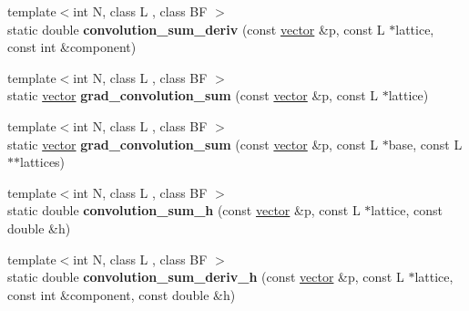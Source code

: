 \begin{DoxyCompactItemize}
\item 
\mbox{\label{classsisl_1_1bcc__quintic__rdo_a5f6c752139fa6c57bc4eaff97880e3ad}} 
{\footnotesize template$<$int N, class L , class BF $>$ }\\static double {\bfseries convolution\+\_\+sum\+\_\+deriv} (const \hyperlink{namespacesisl_a2069bd5374a9be042ff3ce3306d41e1a}{vector} \&p, const L $\ast$lattice, const int \&component)
\item 
\mbox{\label{classsisl_1_1bcc__quintic__rdo_ad2e39720168ce1b104c7d2a1e9acbd7d}} 
{\footnotesize template$<$int N, class L , class BF $>$ }\\static \hyperlink{namespacesisl_a2069bd5374a9be042ff3ce3306d41e1a}{vector} {\bfseries grad\+\_\+convolution\+\_\+sum} (const \hyperlink{namespacesisl_a2069bd5374a9be042ff3ce3306d41e1a}{vector} \&p, const L $\ast$lattice)
\item 
\mbox{\label{classsisl_1_1bcc__quintic__rdo_abbae951856f73348c7507d70773f12a1}} 
{\footnotesize template$<$int N, class L , class BF $>$ }\\static \hyperlink{namespacesisl_a2069bd5374a9be042ff3ce3306d41e1a}{vector} {\bfseries grad\+\_\+convolution\+\_\+sum} (const \hyperlink{namespacesisl_a2069bd5374a9be042ff3ce3306d41e1a}{vector} \&p, const L $\ast$base, const L $\ast$$\ast$lattices)
\item 
\mbox{\label{classsisl_1_1bcc__quintic__rdo_a1f26e8a7f101f0f29d152b2653feb7f5}} 
{\footnotesize template$<$int N, class L , class BF $>$ }\\static double {\bfseries convolution\+\_\+sum\+\_\+h} (const \hyperlink{namespacesisl_a2069bd5374a9be042ff3ce3306d41e1a}{vector} \&p, const L $\ast$lattice, const double \&h)
\item 
\mbox{\label{classsisl_1_1bcc__quintic__rdo_aeceb46b771f4a2b6cc6c8c5509d78c60}} 
{\footnotesize template$<$int N, class L , class BF $>$ }\\static double {\bfseries convolution\+\_\+sum\+\_\+deriv\+\_\+h} (const \hyperlink{namespacesisl_a2069bd5374a9be042ff3ce3306d41e1a}{vector} \&p, const L $\ast$lattice, const int \&component, const double \&h)
\item 
$$
\end{DoxyCompactItemize}
